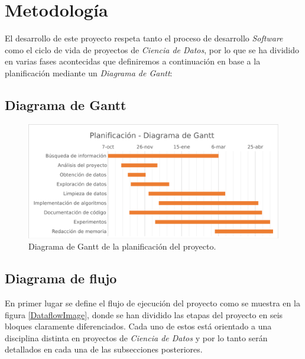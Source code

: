 
\chapter{Metodología}
\label{metodologia}

El desarrollo de este proyecto respeta tanto el proceso de desarrollo \textit{Software} como el ciclo de vida de proyectos de \textit{Ciencia de Datos}, por lo que se ha dividido en varias fases acontecidas que definiremos a continuación en base a la planificación mediante un \textit{Diagrama de Gantt}:

\section{Diagrama de Gantt}

    \begin{figure}[H]
        \centering
        \includegraphics[width=15cm]{archivos/4.Metodologia/GranttImage}
        \caption{Diagrama de Gantt de la planificación del proyecto.}
        \label{GranttImage}
    \end{figure}


\section{Diagrama de flujo}

    En primer lugar se define el flujo de ejecución del proyecto como se muestra en la figura \ref{DataflowImage}, donde se han dividido las etapas del proyecto en seis bloques claramente diferenciados. Cada uno de estos está orientado a una disciplina distinta en proyectos de \textit{Ciencia de Datos} y por lo tanto serán detallados en cada una de las subsecciones posteriores.


